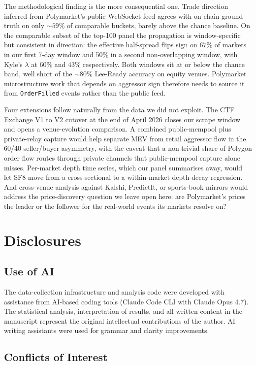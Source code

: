 \documentclass[11pt,a4paper,twocolumn]{article}
\begin{document}
The methodological finding is the more consequential one. Trade
direction inferred from Polymarket's public WebSocket feed agrees with
on-chain ground truth on only $\sim 59\%$ of comparable buckets,
barely above the chance baseline. On the comparable subset of the
top-100 panel the propagation is window-specific but consistent in
direction: the effective half-spread flips sign on 67\% of markets
in our first 7-day window and 50\% in a second non-overlapping
window, with Kyle's $\lambda$ at 60\% and 43\% respectively. Both
windows sit at or below the chance band, well short of the
$\sim 80\%$ Lee-Ready accuracy on equity venues. Polymarket
microstructure work that depends on aggressor sign therefore needs
to source it from \texttt{OrderFilled} events rather than the public
feed.

Four extensions follow naturally from the data we did not exploit.
The CTF Exchange V1 to V2 cutover at the end of April 2026 closes our
scrape window and opens a venue-evolution comparison. A combined
public-mempool plus private-relay capture would help separate MEV
from retail aggressor flow in the 60/40 seller/buyer asymmetry, with
the caveat that a non-trivial share of Polygon order flow routes
through private channels that public-mempool capture alone misses. Per-market depth time series,
which our panel summarises away, would let SF8 move from a
cross-sectional to a within-market depth-decay regression. And
cross-venue analysis against Kalshi, PredictIt, or sports-book
mirrors would address the price-discovery question we leave open
here: are Polymarket's prices the leader or the follower for the
real-world events its markets resolve on?
\section{Disclosures}\label{sec:disclosures}

\subsection{Use of AI}

The data-collection infrastructure and analysis code were developed
with assistance from AI-based coding tools (Claude Code CLI with
Claude Opus 4.7). The statistical analysis, interpretation of
results, and all written content in the manuscript represent the
original intellectual contributions of the author. AI writing
assistants were used for grammar and clarity improvements.

\subsection{Conflicts of Interest}
\end{document}
